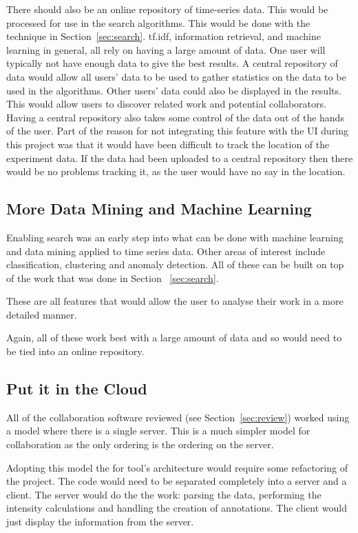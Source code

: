 There should also be an online repository of time-series data.  This would be processed for use in the search algorithms.  This would be done with the technique in Section~\ref{sec:search}.  \ac{tf.idf}, information retrieval, and machine learning in general, all rely on having a large amount of data.  One user will typically not have enough data to give the best results.  A central repository of data would allow all users' data to be used to gather statistics on the data to be used in the algorithms.  Other users' data could also be displayed in the results.  This would allow users to discover related work and potential collaborators.  Having a central repository also takes some control of the data out of the hands of the user.  Part of the reason for not integrating this feature with the \ac{UI} during this project was that it would have been difficult to track the location of the experiment data.  If the data had been uploaded to a central repository then there would be no problems tracking it, as the user would have no say in the location.

\subsection{More Data Mining and Machine Learning}

Enabling search was an early step into what can be done with machine learning and data mining applied to time series data.  Other areas of interest include classification, clustering and anomaly detection.  All of these can be built on top of the work that was done in Section ~\ref{sec:search}.

These are all features that would allow the user to analyse their work in a more detailed manner.

Again, all of these work best with a large amount of data and so would need to be tied into an online repository.

\subsection{Put it in the Cloud}
\label{sec:cloud}
All of the collaboration software reviewed (see Section~\ref{sec:review}) worked using a model where there is a single server.  This is a much simpler model for collaboration as the only ordering is the ordering on the server.

Adopting this model the for tool's architecture would require some refactoring of the project.  The code would need to be separated completely into a server and a client.  The server would do the the work: parsing the data, performing the intensity calculations and handling the creation of annotations.  The client would just display the information from the server.

